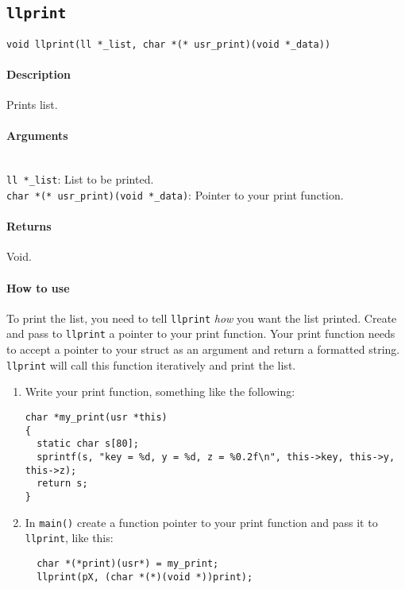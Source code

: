 \documentclass{article}
\begin{document}
\subsection{\texttt{llprint}}
\label{llprint}
\begin{verbatim}
void llprint(ll *_list, char *(* usr_print)(void *_data)) 
\end{verbatim}

\paragraph{Description}

Prints list.

\paragraph{Arguments}
\verb| |\\
\verb|ll *_list|: List to be printed.\\
\verb|char *(* usr_print)(void *_data)|: Pointer to your print function.

\paragraph{Returns}

Void.

\paragraph{How to use}

To print the list, you need to tell \verb|llprint| \emph{how} you want the list printed. Create and
pass to \verb|llprint| a pointer to your print function. Your print function needs to accept a
pointer to your struct as an argument and return a formatted string. \verb|llprint| will call this
function iteratively and print the list.

\begin{enumerate}
\item Write your print function, something like the following:\\[8pt]
\begin{verbatim}
char *my_print(usr *this)
{
  static char s[80];
  sprintf(s, "key = %d, y = %d, z = %0.2f\n", this->key, this->y, this->z);
  return s;
}
\end{verbatim}

\item In \verb|main()| create a function pointer to your print function and pass it to \verb|llprint|, like this:\\[8pt]
\begin{verbatim}
  char *(*print)(usr*) = my_print;
  llprint(pX, (char *(*)(void *))print);
\end{verbatim}
\end{enumerate}
\end{document}
